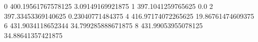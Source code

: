 0 400.19561767578125 3.09149169921875
1 397.1041259765625 0.0
2 397.33453369140625 0.23040771484375
4 416.97174072265625 19.86761474609375
6 431.9034118652344 34.799285888671875
8 431.99053955078125 34.88641357421875
